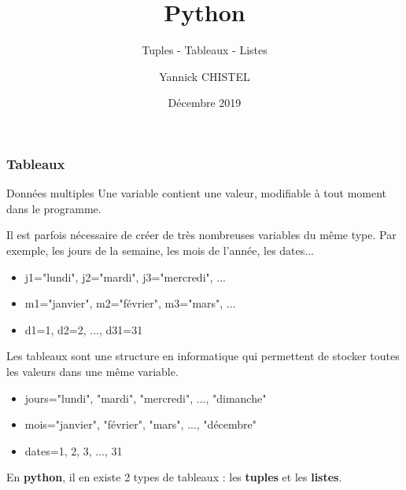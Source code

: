 \documentclass[9pt]{beamer}
\title{Python}
\subtitle{Tuples - Tableaux - Listes}
\author{Yannick CHISTEL}
\institute{Lycée Dumont d'Urville - CAEN}
\date{Décembre 2019}
\begin{document}
 
\frame{\titlepage}

\begin{frame}
\frametitle{Tableaux}


\begin{block}{Données multiples}
Une variable contient une valeur, modifiable à tout moment dans le programme.

Il est parfois nécessaire de créer de très nombreuses variables du même type. Par exemple, les jours de la semaine, les mois de l'année, les dates...

\begin{itemize}
\item j1="lundi", j2="mardi", j3="mercredi", ...
\item m1="janvier", m2="février", m3="mars", ...
\item d1=1, d2=2, ..., d31=31
\end{itemize}

Les tableaux sont une structure en informatique qui permettent de stocker toutes les valeurs dans une même variable.

\begin{itemize}
\item jours="lundi", "mardi", "mercredi", ..., "dimanche"
\item mois="janvier", "février", "mars", ..., "décembre"
\item dates=1, 2, 3, ..., 31
\end{itemize}


En \textbf{python}, il en existe 2 types de tableaux : les \textbf{tuples} et les \textbf{listes}.
\end{block}

%

\end{frame}
\end{document}
